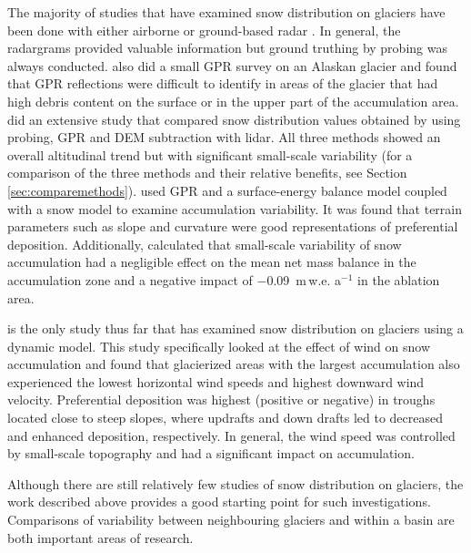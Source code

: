 \documentclass{sfuthesis}
\begin{document}
The majority of studies that have examined snow distribution on glaciers have been done with either airborne or ground-based radar \citep[e.g.][]{Winther1998,Machguth2006, Grabiec2011, Pelt2014,McGrath2015}. In general, the radargrams provided valuable information but ground truthing by probing was always conducted. \cite{Gusmeroli2014} also did a small GPR survey on an Alaskan glacier and found that GPR reflections were difficult to identify in areas of the glacier that had high debris content on the surface or in the upper part of the accumulation area. \cite{Sold2013} did an extensive study that compared snow distribution values obtained by using probing, GPR and DEM subtraction with lidar. All three methods showed an overall altitudinal trend but with significant small-scale variability (for a comparison of the three methods and their relative benefits, see Section \ref{sec:comparemethods}). \cite{Pelt2014} used GPR and a surface-energy balance model coupled with a snow model to examine accumulation variability. It was found that terrain parameters such as slope and curvature were good representations of preferential deposition. Additionally, \cite{Pelt2014} calculated that small-scale variability of snow accumulation had a negligible effect on the mean net mass balance in the accumulation zone and a negative impact of $-$0.09 \,m\,w.e. a$^{-1}$ in the ablation area.

\cite{Dadic2010} is the only study thus far that has examined snow distribution on glaciers using a dynamic model. This study specifically looked at the effect of wind on snow accumulation and found that glacierized areas with the largest accumulation also experienced the lowest horizontal wind speeds and highest downward wind velocity. Preferential deposition was highest (positive or negative) in troughs located close to steep slopes, where updrafts and down drafts led to decreased and enhanced deposition, respectively. In general, the wind speed was controlled by small-scale topography and had a significant impact on accumulation. 

Although there are still relatively few studies of snow distribution on glaciers, the work described above provides a good starting point for such investigations. Comparisons of variability between neighbouring glaciers and within a basin are both important areas of research.
\end{document}
